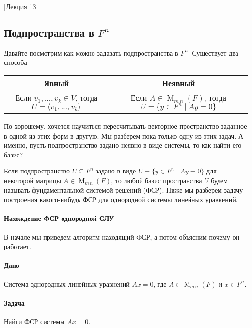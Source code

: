 [Лекция 13]


\subsection{Подпространства в $F^n$}
\label{section::Subspaces}

Давайте посмотрим как можно задавать подпространства в $F^n$.
Существует два способа
\vspace{3pt}

\begin{tabular}{c|c}
{\bf Явный}&{\bf Неявный}\\
\hline
{Если $v_1,\ldots,v_k\in V$, тогда $U = \langle v_1,\ldots, v_k \rangle$}&{Если $A\in \operatorname{M}_{m\,n}(F)$, тогда $U = \{y\in F^n \mid Ay = 0\}$}\\
\end{tabular}
\vspace{3pt}

По-хорошему, хочется научиться пересчитывать векторное пространство заданное в одной из этих форм в другую.
Мы разберем пока только одну из этих задач.
А именно, пусть подпространство задано неявно в виде системы, то как найти его базис?

Если подпространство $U\subseteq F^n$ задано в виде $U = \{y\in F^n\mid Ay = 0\}$ для некоторой матрицы $A\in\operatorname{M}_{m\,n}(F)$, то любой базис пространства $U$ будем называть фундаментальной системой решений (ФСР).
Ниже мы разберем задачу построения какого-нибудь ФСР для однородной системы линейных уравнений.

\paragraph{Нахождение ФСР однородной СЛУ}

В начале мы приведем алгоритм находящий ФСР, а потом объясним почему он работает.

\paragraph{Дано} Система однородных линейных уравнений $Ax = 0$, где $A\in \operatorname{M}_{m\,n}(F)$ и $x\in F^n$.

\paragraph{Задача} Найти ФСР системы $Ax = 0$.

